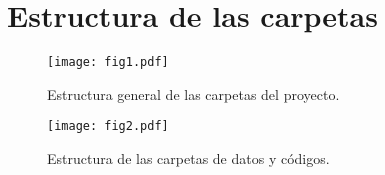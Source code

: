 \documentclass[11pt,en]{elegantpaper}
\begin{document}
\newpage 
\appendix 
\section{Estructura de las carpetas}
\label{sec:appendix}
\begin{figure}[htbp]
	\centering
	\caption{Estructura general de las carpetas del proyecto.\label{fig:carpetas}}
	\texttt{[image: fig1.pdf]}
\end{figure}


\begin{figure}[htbp]
	\centering
	\caption{Estructura de las carpetas de datos y códigos. \label{fig:code}}
	\texttt{[image: fig2.pdf]}
\end{figure}

\end{document}
